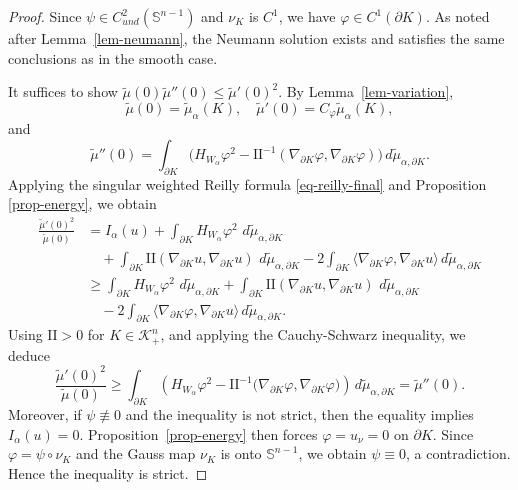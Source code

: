 \documentclass[12pt,leqno]{amsart}
\theoremstyle{plain} \newtheorem{thm}{Theorem}[section]
\theoremstyle{plain} \newtheorem{prop}[thm]{Proposition}
\theoremstyle{plain} \newtheorem{prob}[thm]{Problem}
\theoremstyle{definition} \newtheorem{defi}[thm]{Definition}
\theoremstyle{plain} \newtheorem{cor}[thm]{Corollary}
\theoremstyle{plain} \newtheorem{lem}[thm]{Lemma}
\theoremstyle{plain} \newtheorem{eg}{Example}[section]
\theoremstyle{remark} \newtheorem{rmk}[thm]{Remark}
\theoremstyle{plain} \newtheorem{conj}{Conjecture}
\numberwithin{equation}{section}
\newcommand{\dd}{\,d}
\begin{document}
\begin{proof}
  Since $\psi\in C^2_{und}(\mathbb{S}^{n-1})$ and $\nu_K$ is $C^1$, we
  have $\varphi\in C^1(\partial K)$. As noted after
  Lemma~\ref{lem-neumann}, the Neumann solution exists and satisfies
  the same conclusions as in the smooth case.

  It suffices to show $\tilde{\mu}(0)\tilde{\mu}''(0)\le\tilde{\mu}'(0)^2$.
  By Lemma~\ref{lem-variation},
  \[
    \tilde{\mu}(0)=\tilde{\mu}_\alpha(K),\quad\tilde{\mu}'(0)=C_\varphi\tilde{\mu}_\alpha(K),
  \]
  and
  \[
  \tilde{\mu}''(0)=\int_{\partial K}\bigl(H_{W_\alpha}\varphi^2-\mathrm{II}^{-1}(\nabla_{\partial K}\varphi,\nabla_{\partial K}\varphi)\bigr)\,d\tilde{\mu}_{\alpha,\partial K}.
  \]
  Applying the singular weighted Reilly formula \eqref{eq-reilly-final} and Proposition \ref{prop-energy}, we obtain
   \begin{align*}
    \frac{\tilde{\mu}'(0)^2}{\tilde{\mu}(0)}
    &=
    I_\alpha(u)
    +
    \int_{\partial K}
      H_{W_\alpha}\varphi^2\,
      \dd\tilde{\mu}_{\alpha,\partial K}  \\
    &\quad
    +
    \int_{\partial K}
      \mathrm{II}(\nabla_{\partial K}u,\nabla_{\partial K}u)\,
      \dd\tilde{\mu}_{\alpha,\partial K}
    -
    2\int_{\partial K}
      \big\langle
        \nabla_{\partial K}\varphi,
        \nabla_{\partial K}u
      \big\rangle
      \dd\tilde{\mu}_{\alpha,\partial K}  \\
    &\ge
    \int_{\partial K}
      H_{W_\alpha}\varphi^2\,
      \dd\tilde{\mu}_{\alpha,\partial K}
    +
    \int_{\partial K}
      \mathrm{II}(\nabla_{\partial K}u,\nabla_{\partial K}u)\,
      \dd\tilde{\mu}_{\alpha,\partial K}       \\
    &\quad
    -
    2\int_{\partial K}
      \big\langle
        \nabla_{\partial K}\varphi,
        \nabla_{\partial K}u
      \big\rangle
      \dd\tilde{\mu}_{\alpha,\partial K}.
  \end{align*}
  Using $\mathrm{II}>0$ for $K\in\mathcal{K}_{+}^n$, and applying the Cauchy-Schwarz inequality, we deduce
    \[
    \frac{\tilde{\mu}'(0)^2}{\tilde{\mu}(0)}
    \ge
    \int_{\partial K}
    \left(
      H_{W_\alpha}\varphi^2
      -
      \mathrm{II}^{-1}
      \bigl(
        \nabla_{\partial K}\varphi,
        \nabla_{\partial K}\varphi
      \bigr)
    \right)
    \dd\tilde{\mu}_{\alpha,\partial K}
    =\tilde{\mu}''(0).
  \]
  Moreover, if $\psi\not\equiv0$ and the inequality is not strict, then the equality implies $I_\alpha(u)=0$. Proposition~\ref{prop-energy} then forces $\varphi = u_\nu = 0$ on $\partial K$. Since $\varphi = \psi \circ \nu_K$ and the Gauss map $\nu_K$ is onto $\mathbb{S}^{n-1}$, we obtain $\psi \equiv 0$, a contradiction. Hence the inequality is strict.
\end{proof}
\end{document}
